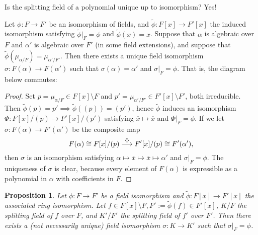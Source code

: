 \documentclass[11pt]{book}
\newcounter{counter}
\newtheorem{proposition}[counter]{Proposition}   \newtheorem{problem}[counter]{Problem}   \newtheorem*{proposition*}{Proposition}   \newtheorem*{lemma*}{Lemma}
\theoremstyle{definition}   \newtheorem{defn}[counter]{Definition} %
\newcommand{\ov}{\overline}   \newcommand{\wt}{\widetilde}
\newcommand{\bs}{\setminus}   \newcommand{\A}{\mathcal{A}}   \newcommand{\sy}{\textnormal{Syl}}   \newcommand{\size}[1]{\left| #1 \right|}
\DeclareMathOperator{\ra}{\rightarrow}   \DeclareMathOperator{\Poly}{\mathbf{P}}   \DeclareMathOperator{\spn}{\textnormal{span}}   \DeclareMathOperator{\aut}{\textnormal{Aut}}
\newcommand{\vs}{\vspace{8pt}}   \newcommand{\hs}{\hspace{8pt}}
\numberwithin{counter}{chapter}
\begin{document}
\vs 

\noindent {} Is the splitting field of a polynomial unique up to isomorphism? Yes! 

\vs

\begin{lemma}
Let $\phi : F \ra F'$ be an isomorphism of fields, and $\wt{\phi} : F[x] \ra F'[x]$ the induced isomorphism satisfying $\wt{\phi}|_F = \phi$ and $\wt{\phi}(x) = x$. Suppose that $\alpha $ is algebraic over $F$ and $\alpha'$ is algebraic over $F'$ (in some field extensions), and suppose that $\wt{\phi}(\mu_{\alpha/F}) = \mu_{\alpha'/F'}$. Then there exists a unique field isomorphism $\sigma : F(\alpha) \ra F(\alpha')$ such that $\sigma(\alpha) = \alpha'$ and $\sigma|_F = \phi$. That is, the diagram below commutes: 

\begin{center}
\end{center}
\end{lemma}

\begin{proof}
Set $p = \mu_{\alpha/F} \in F[x] \bs F$ and $p' = \mu_{\alpha'/F'} \in F'[x] \bs F'$, both irreducible. Then $\wt{\phi}(p) = p' \implies \wt{\phi}((p)) = (p')$, hence $\wt{\phi}$ induces an isomorphism $\Phi : F[x]/(p) \ra F'[x]/(p')$ satisfying $\ov{x} \mapsto \ov{x}$ and $\Phi|_F = \phi$. If we let $\sigma : F(\alpha) \ra F'(\alpha')$ be the composite map
	\[F(\alpha) \cong F[x]/(p) \overset{\Phi}{\longrightarrow} F'[x]/(p) \cong F'(\alpha'), \]
then $\sigma$ is an isomorphism satisfying $\alpha \mapsto \ov{x} \mapsto \ov{x} \mapsto \alpha'$ and $\sigma|_F = \phi$. The uniqueness of $\sigma$ is clear, because every element of $F(\alpha)$ is expressible as a polynomial in $\alpha$ with coefficients in $F$. 
\end{proof}

\vs

\begin{proposition}
Let $\phi : F \ra F'$ be a field isomorphism and $\wt{\phi} : F[x] \ra F'[x]$ the associated ring isomorphism. Let $f \in F[x] \bs F, F' := \wt{\phi}(f) \in F'[x]$, $K/F$ the splitting field of $f$ over $F$, and $K'/F'$ the splitting field of $f'$ over $F'$. Then there exists a (not necessarily unique) field isomorphism $\sigma : K \ra K'$ such that $\sigma|_F = \phi$. \qquad \qquad
{}
\end{proposition}
\end{document}
